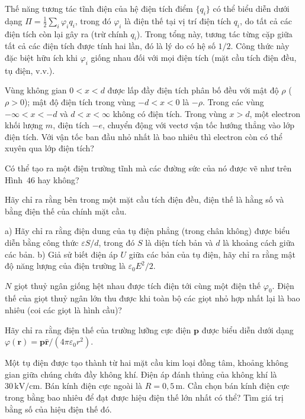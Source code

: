 Thế năng tương tác tĩnh điện của hệ điện tích điểm $\{q_i\}$ có thể biểu diễn dưới dạng $\Pi = \frac{1}{2}\sum_i \varphi_i q_i$, trong đó $\varphi_i$ là điện thế tại vị trí điện tích $q_i$, do tất cả các điện tích còn lại gây ra (trừ chính $q_i$). Trong tổng này, tương tác từng cặp giữa tất cả các điện tích được tính hai lần, đó là lý do có hệ số $1/2$. Công thức này đặc biệt hữu ích khi $\varphi_i$ giống nhau đối với mọi điện tích (mặt cầu tích điện đều, tụ điện, v.v.).

 Vùng không gian $0<x<d$ được lấp đầy điện tích phân bố đều với mật độ $\rho$ ($\rho>0$); mật độ điện tích trong vùng $-d<x<0$ là $-\rho$. Trong các vùng $-\infty<x<-d$ và $d<x<\infty$ không có điện tích. Trong vùng $x>d$, một electron khối lượng $m$, điện tích $-e$, chuyển động với vectơ vận tốc hướng thẳng vào lớp điện tích. Với vận tốc ban đầu nhỏ nhất là bao nhiêu thì electron còn có thể xuyên qua lớp điện tích?


 Có thể tạo ra một điện trường tĩnh mà các đường sức của nó được vẽ như trên Hình~46 hay không?

 Hãy chỉ ra rằng bên trong một mặt cầu tích điện đều, điện thế là hằng số và bằng điện thế của chính mặt cầu.

 a) Hãy chỉ ra rằng điện dung của tụ điện phẳng (trong chân không) được biểu diễn bằng công thức $\varepsilon S/d$, trong đó $S$ là diện tích bản và $d$ là khoảng cách giữa các bản. b) Giả sử biết điện áp $U$ giữa các bản của tụ điện, hãy chỉ ra rằng mật độ năng lượng của điện trường là $\varepsilon_0 E^2/2$.

 $N$ giọt thuỷ ngân giống hệt nhau được tích điện tới cùng một điện thế $\varphi_0$. Điện thế của giọt thuỷ ngân lớn thu được khi toàn bộ các giọt nhỏ hợp nhất lại là bao nhiêu (coi các giọt là hình cầu)?


 Hãy chỉ ra rằng điện thế của trường lưỡng cực điện $\mathbf{p}$ được biểu diễn dưới dạng $\varphi(\mathbf{r}) = \mathbf{p}\hat{\mathbf{r}}/(4\pi\varepsilon_0 r^2)$.

 Một tụ điện được tạo thành từ hai mặt cầu kim loại đồng tâm, khoảng không gian giữa chúng chứa đầy không khí. Điện áp đánh thủng của không khí là $30\,\mathrm{kV/cm}$. Bán kính điện cực ngoài là $R=0{,}5\,\mathrm{m}$. Cần chọn bán kính điện cực trong bằng bao nhiêu để đạt được hiệu điện thế lớn nhất có thể? Tìm giá trị bằng số của hiệu điện thế đó.

